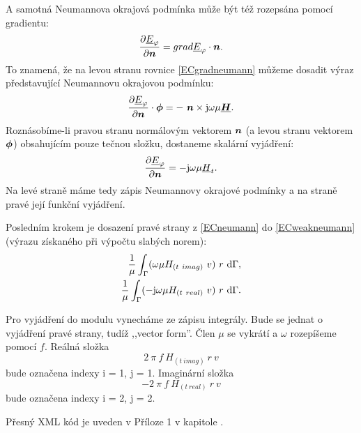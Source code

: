 \documentclass[12pt,a4paper,oneside]{article}
\numberwithin{equation}{section} %
\numberwithin{figure}{section} %
\numberwithin{table}{section} %
\newcommand{\mj}{\mathrm{j}} %
\renewcommand{\vec}[1]{\mbox{\boldmath$#1$}} %
\newcommand{\faz}[1]{{\underline{#1}}} %
\begin{document}
A samotná Neumannova okrajová podmínka může být též rozepsána pomocí gradientu:
\begin{equation}
\label{ECgradneumann}
\frac{\partial \faz{E} _{\varphi}}{\partial \vec{n}} = grad \faz{E} _{\varphi} \cdot \vec{n} .
\end{equation}
To znamená, že na levou stranu rovnice \ref{ECgradneumann} můžeme dosadit výraz představující Neumannovu okrajovou podmínku:
\begin{equation}
\label{NeumannECvek}
\frac{\partial \faz{E}_{\varphi}}{\partial \vec{n}} \cdot \vec{\phi} = - ~ \vec{n} \times \mj \omega \mu \faz{\vec{H}} .
\end{equation}
Roznásobíme-li pravou stranu normálovým vektorem $\vec{n}$ (a levou stranu vektorem $\vec{\phi}$) obsahujícím pouze tečnou složku, dostaneme skalární vyjádření:
\begin{equation}
\label{ECneumann}
\frac{\partial \faz{E}_{\varphi}}{\partial \vec{n}} = - \mj \omega \mu \faz{H}_t .
\end{equation}
Na levé straně máme tedy zápis Neumannovy okrajové podmínky a na straně pravé její funkční vyjádření.

Posledním krokem je dosazení pravé strany z \ref{ECneumann} do \ref{ECweakneumann} (výrazu získaného při výpočtu slabých norem):
\begin{subequations}
\begin{align}
\frac{1}{\mu} \int _{\Gamma} ( \omega \mu H_{(t~imag)} ~ v ) ~ r ~ \ud \Gamma ,
\\ 
\frac{1}{\mu} \int _{\Gamma} ( - \mj \omega \mu H_{(t~real)} ~ v ) ~ r ~ \ud \Gamma .
\end{align}
\end{subequations}

Pro vyjádření do modulu vynecháme ze zápisu integrály. Bude se jednat o vyjádření pravé strany, tudíž ,,vector form''. Člen $\mu$ se vykrátí a $\omega$ rozepíšeme pomocí $f$. Reálná složka 
\begin{equation}
2 ~ \pi ~ f ~ H_{(t~imag)} ~ r ~ v
\end{equation} 
bude označena indexy i = 1, j = 1. Imaginární složka 
\begin{equation}
- 2 ~ \pi ~ f ~ H_{(t~real)} ~ r ~ v
\end{equation}
bude označena indexy i = 2, j = 2.

Přesný XML kód je uveden v Příloze 1 v kapitole .
\end{document}
